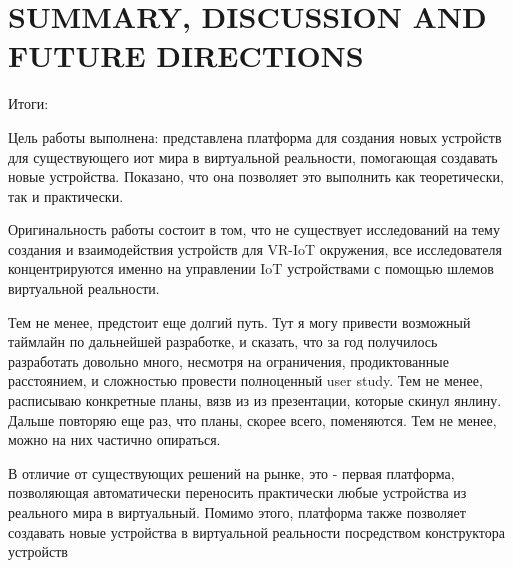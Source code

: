 
\chapter{SUMMARY, DISCUSSION AND FUTURE DIRECTIONS}

Итоги:

Цель работы выполнена: представлена платформа для создания новых устройств для существующего иот мира в виртуальной реальности, помогающая создавать новые устройства. Показано, что она позволяет это выполнить как теоретически, так и практически.

Оригинальность работы состоит в том, что не существует исследований на тему создания и взаимодействия устройств для VR-IoT окружения, все исследователя концентрируются именно на управлении IoT устройствами с помощью шлемов виртуальной реальности.

Тем не менее, предстоит еще долгий путь. Тут я могу привести возможный таймлайн по дальнейшей разработке, и сказать, что за год получилось разработать довольно много, несмотря на ограничения, продиктованные расстоянием, и сложностью провести полноценный user study. Тем не менее, расписываю конкретные планы, вязв из из презентации, которые скинул янлину. Дальше повторяю еще раз, что планы, скорее всего, поменяются. Тем не менее, можно на них частично опираться.



В отличие от существующих решений на рынке, это - первая платформа, позволяющая автоматически переносить практически любые устройства из реального мира в виртуальный. Помимо этого, платформа также позволяет создавать новые устройства в виртуальной реальности посредством конструктора устройств

